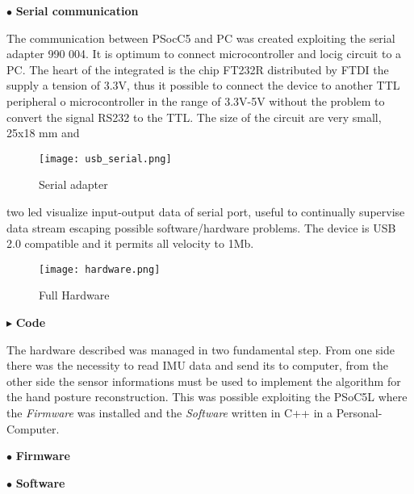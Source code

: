 \noindent $\bullet$ \textbf{Serial communication}

The communication between PSocC5 and PC was created exploiting the serial adapter 990 004. It is optimum to connect microcontroller and locig circuit to a PC. The heart of the integrated is the chip FT232R distributed by FTDI the supply a tension of 3.3V, thus it possible to connect the device to another TTL peripheral o microcontroller in the range of 3.3V-5V without the problem to convert the signal RS232 to  the TTL. The size of the circuit are very small, 25x18 mm and
\begin{figure}[h]
\centering
\texttt{[image: usb\_serial.png]}
\caption{Serial adapter}
\label{fig:serial_adapter}
\end{figure}
two led visualize  input-output data of serial port, useful to continually supervise data stream escaping possible software/hardware problems. The device is USB 2.0 compatible and it permits all velocity to 1Mb. 

\begin{figure}[h]
\centering
\texttt{[image: hardware.png]}
\caption{Full Hardware}
\label{fig:hardware}
\end{figure}


\noindent $\blacktriangleright$  \textbf{Code} \\ %
\newline

The hardware described was managed in two fundamental step.  From one side there was the necessity to read IMU data and send its to computer, from the other side the sensor informations must be used to implement the algorithm for the  hand posture reconstruction.  
This was possible exploiting the PSoC5L where the \textit{Firmware} was installed and the \textit{Software} written in C++ in a Personal-Computer.

 \noindent $\bullet$ \textbf{Firmware}

 


\noindent $\bullet$ \textbf{Software}
